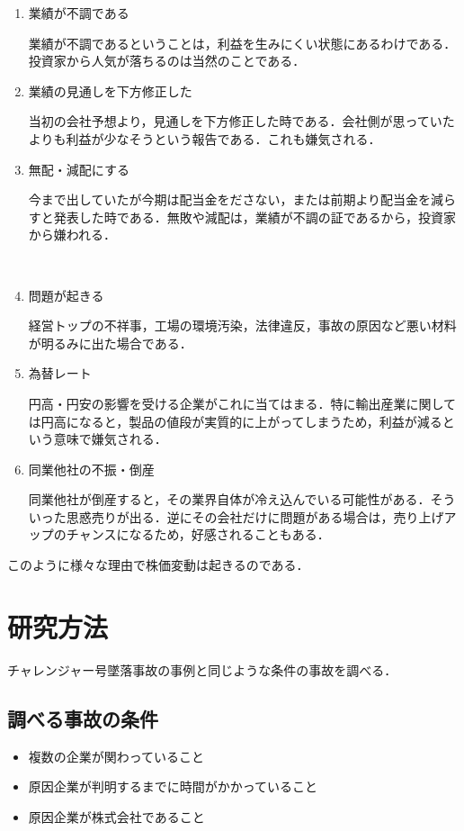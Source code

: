 \begin{enumerate}
  \item 業績が不調である

業績が不調であるということは，利益を生みにくい状態にあるわけである．投資家から人気が落ちるのは当然のことである．



  \item 業績の見通しを下方修正した

当初の会社予想より，見通しを下方修正した時である．会社側が思っていたよりも利益が少なそうという報告である．これも嫌気される．
　
  \item 無配・減配にする

今まで出していたが今期は配当金をださない，または前期より配当金を減らすと発表した時である．無敗や減配は，業績が不調の証であるから，投資家から嫌われる．

　
  \item 問題が起きる

経営トップの不祥事，工場の環境汚染，法律違反，事故の原因など悪い材料が明るみに出た場合である．
　
  \item 為替レート

円高・円安の影響を受ける企業がこれに当てはまる．特に輸出産業に関しては円高になると，製品の値段が実質的に上がってしまうため，利益が減るという意味で嫌気される．

  \item 同業他社の不振・倒産

同業他社が倒産すると，その業界自体が冷え込んでいる可能性がある．そういった思惑売りが出る．逆にその会社だけに問題がある場合は，売り上げアップのチャンスになるため，好感されることもある\cite{kabudown}．
\end{enumerate}

このように様々な理由で株価変動は起きるのである．





\chapter{研究方法}


チャレンジャー号墜落事故の事例と同じような条件の事故を調べる．



\section{調べる事故の条件}
\begin{itemize}
  \item 複数の企業が関わっていること
  \item 原因企業が判明するまでに時間がかかっていること
  \item 原因企業が株式会社であること

\end{itemize}


